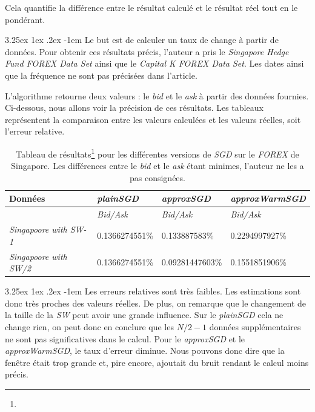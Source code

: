 \documentclass[a4paper, 11pt]{article}
\makeatletter
\newcounter{subsubsubsection}[subsubsection]
\renewcommand\paragraph{\@startsection{paragraph}{5}{\z@}%
  {3.25ex \@plus1ex \@minus.2ex}%
  {-1em}%
  {\normalfont\normalsize\bfseries}}
\makeatother
\begin{document}
Cela quantifie la différence entre le résultat calculé et le résultat réel tout en le pondérant.

\paragraph{}
Le but est de calculer un taux de change à partir de données. Pour obtenir ces résultats précis, l'auteur a pris le
\textit{Singapore Hedge Fund FOREX Data Set} ainsi que le \textit{Capital K FOREX Data Set}. Les dates ainsi que la fréquence
ne sont pas précisées dans l'article.

L'algorithme retourne deux valeurs : le \textit{bid} et le \textit{ask} à partir des données fournies. Ci-dessous, nous allons
voir la précision de ces résultats. Les tableaux représentent la
comparaison entre les valeurs calculées et les valeurs réelles, soit l'erreur relative.

\begin{table}[H]
	\centering
\begin{tabular}{|l|l|l|l|}
	\hline
	Données & \textit{plainSGD} & \textit{approxSGD} & \textit{approxWarmSGD}\\
	\hline
	\ & \textit{Bid/Ask} & \textit{Bid/Ask} & \textit{Bid/Ask} \\
	\hline
	\textit{Singapoore with SW-1\footnotemark{}} & 0.1366274551\% & 0.133887583\% & 0.2294997927\% \\
	\hline
	\textit{Singapoore with SW/2\footnotemark{}} & 0.1366274551\% & 0.09281447603\% & 0.1551851906\%\\
	\hline

\end{tabular}
\caption[]{Tableau de résultats\footnote[3]{} pour les différentes versions de \textit{SGD} sur le
\textit{FOREX} de Singapore. Les différences entre le \textit{bid} et le \textit{ask} étant minimes,
l'auteur ne les a pas consignées.}
\end{table}

 \addtocounter{footnote}{-2} %



\paragraph{}
Les erreurs relatives sont très faibles. Les estimations sont donc très proches des valeurs réelles. De plus, on
remarque que le  changement de la taille de la \textit{SW} peut avoir une grande influence. Sur le \textit{plainSGD}
cela ne change rien, on peut donc en conclure que les $N/2 - 1$ données supplémentaires ne sont pas significatives
dans le calcul. Pour le \textit{approxSGD} et le \textit{approxWarmSGD}, le taux d'erreur diminue. Nous pouvons donc
dire que la fenêtre était trop grande et, pire encore, ajoutait du bruit rendant le calcul moins précis.
\end{document}
